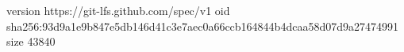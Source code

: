 version https://git-lfs.github.com/spec/v1
oid sha256:93d9a1e9b847e5db146d41c3e7aec0a66ccb164844b4dcaa58d07d9a27474991
size 43840
